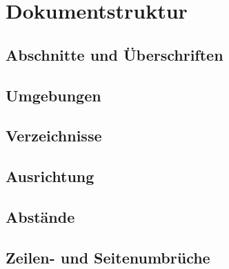 \section{Dokumentstruktur}

\subsection{Abschnitte und Überschriften}

\subsection{Umgebungen}

\subsection{Verzeichnisse}

\subsection{Ausrichtung}

\subsection{Abstände}

\subsection{Zeilen- und Seitenumbrüche}

\newpage